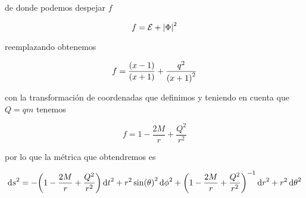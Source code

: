 \documentclass[../Main.tex]{subfiles}
\begin{document}
de donde podemos despejar $f$

\begin{equation}
    f=\mathcal{E}+\abs{\Phi}^{2}
\end{equation}

reemplazando obtenemos

\begin{equation}
    f=\dfrac{\qty(x-1)}{\qty(x+1)}+\dfrac{q^{2}}{\qty(x+1)^{2}}
\end{equation}

con la transformación de coordenadas que definimos y teniendo en cuenta que $Q=qm$ tenemos

\begin{equation}
    f=1-\dfrac{2M}{r}+\dfrac{Q^{2}}{r^{2}}
\end{equation}

por lo que la métrica que obtendremos es

\begin{equation}
    \dd{s}^{2} = -\qty(1-\dfrac{2M}{r}+\dfrac{Q^{2}}{r^{2}})\dd{t}^{2}+r^{2}\sin(\theta)^{2}\dd{\phi}^{2}+\qty(1-\dfrac{2M}{r}+\dfrac{Q^{2}}{r^{2}})^{-1}\dd{r}^{2}+r^{2}\dd{\theta}^{2}
\end{equation}






\biblio %
\end{document}

